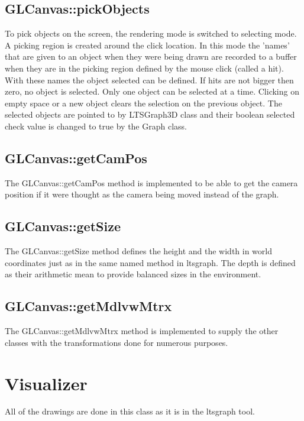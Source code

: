 \documentclass[a4paper]{article}
\begin{document}
\subsection{GLCanvas::pickObjects}
To pick objects on the screen, the rendering mode is switched to selecting mode. A picking region is created around the click location. In this mode the 'names' that are given to an object when they were being drawn are recorded to a buffer when they are in the picking region defined by the mouse click (called a hit). With these names the object selected can be defined. If hits are not bigger then zero, no object is selected. Only one object can be selected at a time. Clicking on empty space or a new object clears the selection on the previous object. The selected objects are pointed to by LTSGraph3D class and their boolean selected check value is changed to true by the Graph class.
\subsection{GLCanvas::getCamPos}
The GLCanvas::getCamPos method is implemented to be able to get the camera position if it were thought as the camera being moved instead of the graph.
\subsection{GLCanvas::getSize}
The GLCanvas::getSize method defines the height and the width in world coordinates just as in the same named method in ltsgraph. The depth is defined as their arithmetic mean to provide balanced sizes in the environment.
\subsection{GLCanvas::getMdlvwMtrx}
The GLCanvas::getMdlvwMtrx method is implemented to supply the other classes with the transformations done for numerous purposes.
\section{Visualizer}
All of the drawings are done in this class as it is in the ltsgraph tool.
\end{document}
